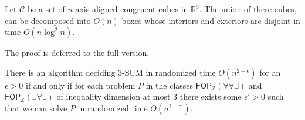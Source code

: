 \begin{lemma}
Let $\mathcal{C}$ be a set of $n$ axis-aligned congruent cubes in $\mathbb{R}^3$. The union of these cubes,
can be decomposed into $O(n)$ boxes whose interiors and exteriors are disjoint in time $O(n \log^2 n)$.
\label{Cubes_in_space}
\end{lemma}
The proof is deferred to the full version.
\begin{theorem}
  There is an algorithm deciding $3$-SUM in randomized time $O(n^{2-\epsilon})$ for an $\epsilon>0$ if and only if
  for each problem $P$ in the classes $\mathsf{FOP}_{\mathbb{Z}}(\forall \forall \exists )$ and $\mathsf{FOP}_{\mathbb{Z}}(\exists \forall \exists )$ of inequality dimension at most $3$ there exists some $\epsilon'>0$ such that we can solve $P$ in randomized time $O(n^{2-\epsilon'})$.
  \label{ineq3}
\end{theorem}
